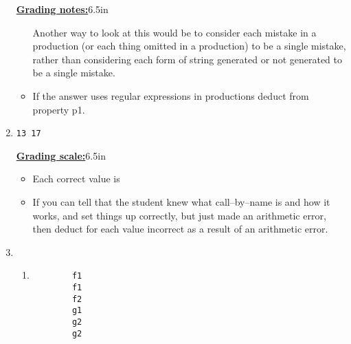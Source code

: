 \documentclass[11pt,fleqn]{article}
\begin{document}
\begin{enumerate}
\begin{info}{\textbf{\underline{Grading notes:}}}{6.5in}
\begin{itemize}
                    Another way to look at this would be to consider each
                    mistake in a production (or each thing omitted in a
                    production) to be a single mistake, rather than
                    considering each form of string generated or not generated
                    to be a single mistake.

              \item If the answer uses regular expressions in productions
                    deduct  from property p1.

            \end{itemize}

          \end{info}


    \item \texttt{13 17}

          \begin{info}{\textbf{\underline{Grading scale:}}}{6.5in}

            \begin{itemize}

              \addtolength{\itemsep}{1mm}

              \item Each correct value is 

              \item If you can tell that the student knew what
                    call--by--name is and how it works, and set things up
                    correctly, but just made an arithmetic error, then
                    deduct  for each value incorrect as a result of
                    an arithmetic error.

            \end{itemize}

          \end{info}


    \item  \begin{enumerate}

             \addtolength{\itemsep}{8mm}

             \item \begin{Verbatim}
        f1
        f1
        f2
        g1
        g2
        g2
             \end{Verbatim}


\end{enumerate}
\end{enumerate}
\end{document}
